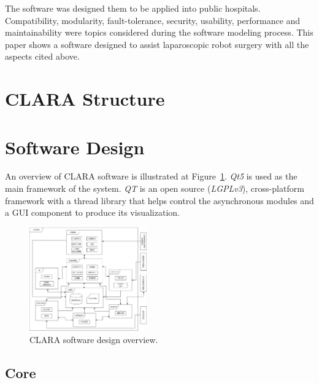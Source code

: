 \documentclass{svproc}
\begin{document}
\begin{multicols}{2}
 	
 	The software was designed them to be applied into public hospitals. Compatibility, modularity, fault-tolerance, security, usability, performance and maintainability were topics considered during the software modeling process. This paper shows a software designed to assist laparoscopic robot surgery with all the aspects cited above.
 	
	\section{CLARA Structure}
	
	
	
	
	\section{Software Design}
	
	An overview of CLARA software is illustrated at Figure~\ref{fig:clara}. \textit{Qt5}\cite{qt} is used as the main framework of the system. \textit{QT} is an open source (\textit{LGPLv3}\cite{lgpl}), cross-platform framework with a thread library that helps control the asynchronous modules and a GUI component to produce its visualization.
	
	\begin{figure}[H]
		\centering
		\includegraphics[width=0.45\textwidth]{clara.png}
		\caption{CLARA software design overview.}
		\label{fig:clara}
	\end{figure}
	
	\subsection{Core}
	
	

\end{multicols}
\end{document}
